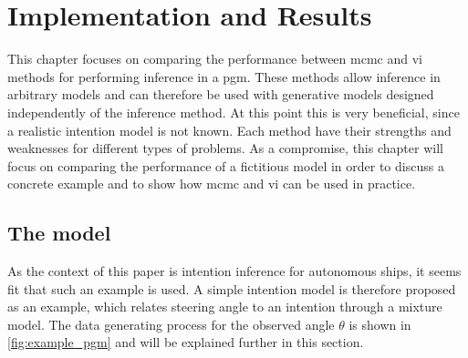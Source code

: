 \chapter{Implementation and Results}\label{chap:impl}

This chapter focuses on comparing the performance between \acrshort{mcmc} and \acrshort{vi} methods for performing inference in a \acrshort{pgm}. These methods allow inference in arbitrary models and can therefore be used with generative models designed independently of the inference method. At this point this is very beneficial, since a realistic intention model is not known. Each method have their strengths and weaknesses for different types of problems. As a compromise, this chapter will focus on comparing the performance of a fictitious model in order to discuss a concrete example and to show how \acrshort{mcmc} and \acrshort{vi} can be used in practice.

\section{The model}
As the context of this paper is intention inference for autonomous ships, it seems fit that such an example is used. A simple intention model is therefore proposed as an example, which relates steering angle to an intention through a mixture model. The data generating process for the observed angle $\theta$ is shown in \cref{fig:example_pgm} and will be explained further in this section.

